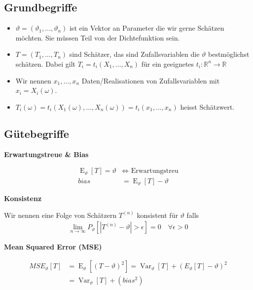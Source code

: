 \documentclass[25pt]{sciposter}
\newcommand{\R}{\mathbb{R}}
\newcommand{\Var}{\operatorname{Var}}
\newcommand{\E}{\operatorname{E}}
\newenvironment{method}[1]{\begin{mdframed}[backgroundcolor=blue!10,innertopmargin=15pt, innerbottommargin=15pt,nobreak=true]
		\textbf{#1 }
	}
	{ 
	\end{mdframed}
}
\begin{document}
\begin{multicols}{3}
\subsection*{Grundbegriffe}

\begin{itemize}
	\item $\vartheta =  (\vartheta_1,\ldots,\vartheta_n)$ ist ein Vektor an Parameter die wir gerne Schätzen möchten. Sie müssen Teil von der Dichtefunktion sein.
	\item $T = (T_1,\ldots,T_n)$ sind Schätzer, das sind Zufallsvariablen die $\vartheta$ bestmöglichst schätzen. Dabei gilt $T_i = t_i(X_1,\ldots,X_n)$ für ein geeignetes $t_i:\R^n \to \R$
	\item Wir nennen $x_1,\ldots,x_n$ Daten/Realisationen von Zufallsvariablen mit $x_i = X_i(\omega)$.
	\item $T_i(\omega) = t_i(X_1(\omega), \ldots, X_n(\omega)) = t_i(x_1,\ldots,x_n) $ heisst Schätzwert.
\end{itemize}

\subsection*{Gütebegriffe}

\begin{method}{Erwartungstreue \& Bias}
	\begin{align*}
	\E_\vartheta[T] = \vartheta &\iff \text{ Erwartungstreu}\\
	bias &= \E_\vartheta[T] - \vartheta
	\end{align*}
\end{method}

\begin{method}{Konsistenz}
	Wir nennen eine Folge von Schätzern $T^{(n)}$ konsistent für $\vartheta$ falls
	\begin{align*}
\lim_{n\to\infty} P_\vartheta [|T^{(n)} - \vartheta| > \epsilon] = 0 \quad \forall \epsilon > 0
	\end{align*}
\end{method}



\begin{method}{Mean Squared Error (MSE)}
\begin{align*}
	MSE_\vartheta[T] &= \E_\vartheta [(T-\vartheta)^2]= \Var_\vartheta[T] + (E_\vartheta [T]-\vartheta)^2\\
	&=  \Var_\vartheta[T] + (bias^2)
\end{align*}
\end{method}





\end{multicols}
\end{document}

